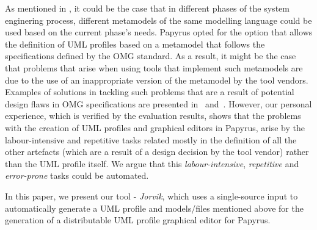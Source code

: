 As mentioned in \cite{kehrer2014versioning}, it could be the case that in different phases of the system enginering process, different metamodels of the same modelling language could be used based on the current phase's needs. Papyrus opted for the option that allows the definition of UML profiles based on a metamodel that follows the specifications defined by the OMG standard. As a result, it might be the case that problems that arise when using tools that implement such metamodels are due to the use of an inappropriate version of the metamodel by the tool vendors. Examples of solutions in tackling such problems that are a result of potential design flaws in OMG specifications are presented in~\cite{alanen2005subset} and~\cite{kelter2008comparing}. However, our personal experience, which is verified by the evaluation results, shows that the problems with the creation of UML profiles and graphical editors in Papyrus, arise by the labour-intensive and repetitive tasks related mostly in the definition of all the other artefacts (which are a result of a design decision by the tool vendor) rather than the UML profile itself. We argue that this \textit{labour-intensive}, \textit{repetitive} and \textit{error-prone} tasks could be automated. 

In this paper, we present our tool - \textit{Jorvik}, which uses a single-source input to automatically generate a UML profile and models/files mentioned above for the generation of a distributable UML profile graphical editor for Papyrus. 
